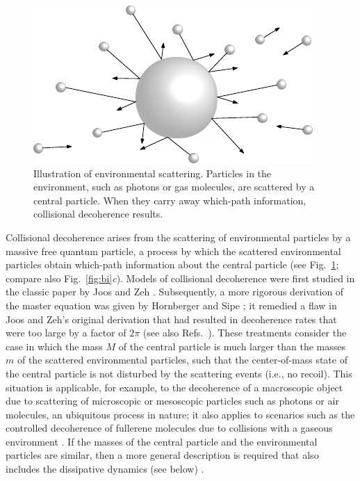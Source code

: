 \documentclass[3p,sort&compress]{elsarticle}
\begin{document}
\begin{figure}
\centering
\includegraphics[scale=0.7]{scatmod.pdf}
\caption{Illustration of environmental scattering. Particles in the environment, such as
  photons or gas molecules, are scattered by a central particle. When they carry away which-path information, collisional decoherence results.}
\label{fig:scatmod}
\end{figure}

Collisional decoherence arises from the scattering of environmental particles by a massive free quantum particle, a process by which the scattered environmental particles obtain which-path information about the central particle (see Fig.~\ref{fig:scatmod}; compare also Fig.~\ref{fig:bi}\emph{c}). Models of collisional decoherence were first studied in the classic paper by Joos and Zeh \cite{Joos:1985:iu}. Subsequently, a more rigorous derivation of the master equation was given by Hornberger and Sipe \cite{Hornberger:2003:un}; it remedied a flaw in Joos and Zeh's original derivation that had resulted in decoherence rates that were too large by a factor of $2\pi$ (see also Refs.~\cite{Gallis:1990:un,Diosi:1995:um,Adler:2006:yb}). These treatments consider the case in which the mass $M$ of the central particle is much larger than the masses $m$ of the scattered environmental particles, such that the center-of-mass state of the central particle is not disturbed by the scattering events (i.e., no recoil). This situation is applicable, for example, to the decoherence of a macroscopic object due to scattering of microscopic or mesoscopic particles such as photons or air molecules, an ubiquitous process in nature; it also applies to scenarios such as the controlled decoherence of fullerene molecules due to collisions with a gaseous environment \cite{Hackermuller:2003:uu,Hornberger:2003:tv}. If the masses of the central particle and the environmental particles are similar, then a more general description is required that also includes the dissipative dynamics (see below) \cite{Diosi:1995:um,Hornberger:2006:tb,Hornberger:2006:tc,Hornberger:2008:ii, Vacchini:2009:pp,Busse:2009:aa,Busse:2010:aa,Busse:2010:oo}. 
\end{document}
